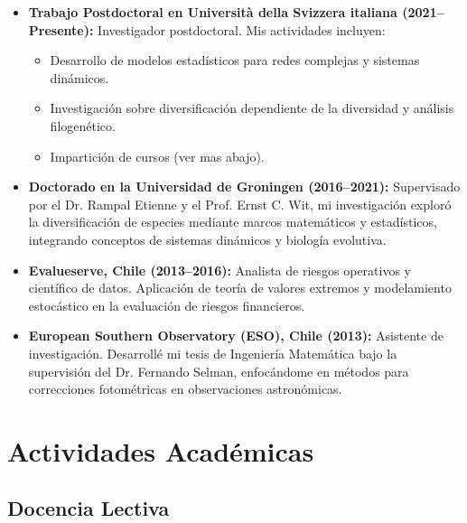 \documentclass[11pt,a4paper]{article}
\begin{document}
\begin{itemize}
    \item \textbf{Trabajo Postdoctoral en Università della Svizzera italiana (2021--Presente):}  
    Investigador postdoctoral. Mis actividades incluyen:
    \begin{itemize}
        \item Desarrollo de modelos estadísticos para redes complejas y sistemas dinámicos.
        \item Investigación sobre diversificación dependiente de la diversidad y análisis filogenético.
        \item Impartición de cursos (ver mas abajo).
    \end{itemize}
    
    \item \textbf{Doctorado en la Universidad de Groningen (2016--2021):}  
    Supervisado por el Dr. Rampal Etienne y el Prof. Ernst C. Wit, mi investigación exploró la diversificación de especies mediante marcos matemáticos y estadísticos, integrando conceptos de sistemas dinámicos y biología evolutiva.

    \item \textbf{Evalueserve, Chile (2013--2016):}  
    Analista de riesgos operativos y científico de datos. Aplicación de teoría de valores extremos y modelamiento estocástico en la evaluación de riesgos financieros.

    \item \textbf{European Southern Observatory (ESO), Chile (2013):}  
    Asistente de investigación. Desarrollé mi tesis de Ingeniería Matemática bajo la supervisión del Dr. Fernando Selman, enfocándome en métodos para correcciones fotométricas en observaciones astronómicas.

 \end{itemize}
    










\section{Actividades Académicas}

\subsection{Docencia Lectiva}
\end{document}
